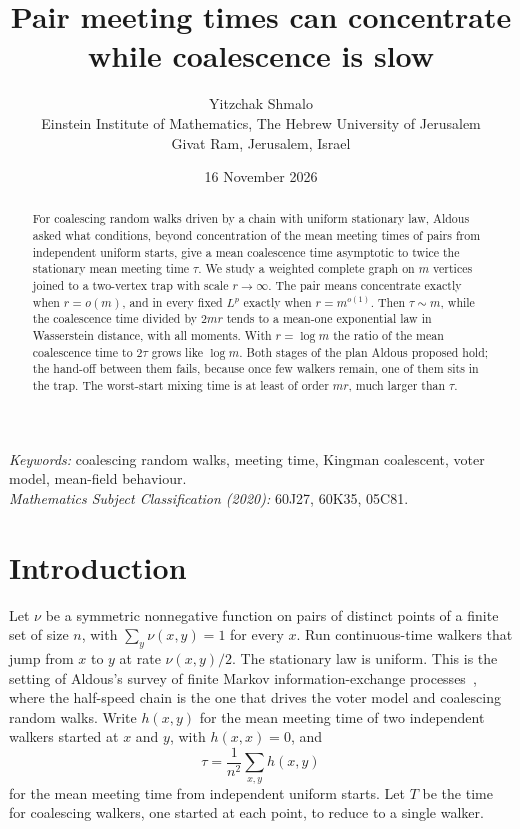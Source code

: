 \documentclass[11pt,a4paper]{article}
\title{\vspace{-1.4em}\textbf{Pair meeting times can concentrate while coalescence is slow}}
\author{Yitzchak Shmalo\\[0.4em]
\small Einstein Institute of Mathematics, The Hebrew University of Jerusalem\\
\small Givat Ram, Jerusalem, Israel}
\date{16 November 2026}
\numberwithin{equation}{section}
\theoremstyle{remark}
\begin{document}
\maketitle

\begin{abstract}
For coalescing random walks driven by a chain with uniform stationary law, Aldous asked what conditions, beyond concentration of the mean meeting times of pairs from independent uniform starts, give a mean coalescence time asymptotic to twice the stationary mean meeting time $\tau$. We study a weighted complete graph on $m$ vertices joined to a two-vertex trap with scale $r\to\infty$. The pair means concentrate exactly when $r=o(m)$, and in every fixed $L^p$ exactly when $r=m^{o(1)}$. Then $\tau\sim m$, while the coalescence time divided by $2mr$ tends to a mean-one exponential law in Wasserstein distance, with all moments. With $r=\log m$ the ratio of the mean coalescence time to $2\tau$ grows like $\log m$. Both stages of the plan Aldous proposed hold; the hand-off between them fails, because once few walkers remain, one of them sits in the trap. The worst-start mixing time is at least of order $mr$, much larger than $\tau$.
\end{abstract}

\noindent\textit{Keywords:} coalescing random walks, meeting time, Kingman coalescent, voter model, mean-field behaviour.\\
\textit{Mathematics Subject Classification (2020):} 60J27, 60K35, 05C81.

\section{Introduction}

Let $\nu$ be a symmetric nonnegative function on pairs of distinct points of a finite set of size $n$, with $\sum_y\nu(x,y)=1$ for every $x$. Run continuous-time walkers that jump from $x$ to $y$ at rate $\nu(x,y)/2$. The stationary law is uniform. This is the setting of Aldous's survey of finite Markov information-exchange processes~\cite{Ald13}, where the half-speed chain is the one that drives the voter model and coalescing random walks. Write $h(x,y)$ for the mean meeting time of two independent walkers started at $x$ and $y$, with $h(x,x)=0$, and
\[
\tau=\frac1{n^2}\sum_{x,y}h(x,y)
\]
for the mean meeting time from independent uniform starts. Let $T$ be the time for coalescing walkers, one started at each point, to reduce to a single walker.
\end{document}
